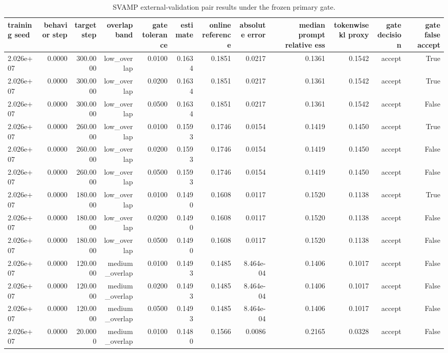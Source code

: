 \begin{table}[t]
\centering
\small
\caption{SVAMP external-validation pair results under the frozen primary gate.}
\label{tab:svamp\_pairs}
\begin{tabular}{lrrrrrrrrrrr}
\toprule
training seed & behavior step & target step & overlap band & gate tolerance & estimate & online reference & absolute error & median prompt relative ess & tokenwise kl proxy & gate decision & gate false accept \\
\midrule
2.026e+07 & 0.0000 & 300.0000 & low\_overlap & 0.0100 & 0.1634 & 0.1851 & 0.0217 & 0.1361 & 0.1542 & accept & True \\
2.026e+07 & 0.0000 & 300.0000 & low\_overlap & 0.0200 & 0.1634 & 0.1851 & 0.0217 & 0.1361 & 0.1542 & accept & True \\
2.026e+07 & 0.0000 & 300.0000 & low\_overlap & 0.0500 & 0.1634 & 0.1851 & 0.0217 & 0.1361 & 0.1542 & accept & False \\
2.026e+07 & 0.0000 & 260.0000 & low\_overlap & 0.0100 & 0.1593 & 0.1746 & 0.0154 & 0.1419 & 0.1450 & accept & True \\
2.026e+07 & 0.0000 & 260.0000 & low\_overlap & 0.0200 & 0.1593 & 0.1746 & 0.0154 & 0.1419 & 0.1450 & accept & False \\
2.026e+07 & 0.0000 & 260.0000 & low\_overlap & 0.0500 & 0.1593 & 0.1746 & 0.0154 & 0.1419 & 0.1450 & accept & False \\
2.026e+07 & 0.0000 & 180.0000 & low\_overlap & 0.0100 & 0.1490 & 0.1608 & 0.0117 & 0.1520 & 0.1138 & accept & True \\
2.026e+07 & 0.0000 & 180.0000 & low\_overlap & 0.0200 & 0.1490 & 0.1608 & 0.0117 & 0.1520 & 0.1138 & accept & False \\
2.026e+07 & 0.0000 & 180.0000 & low\_overlap & 0.0500 & 0.1490 & 0.1608 & 0.0117 & 0.1520 & 0.1138 & accept & False \\
2.026e+07 & 0.0000 & 120.0000 & medium\_overlap & 0.0100 & 0.1493 & 0.1485 & 8.464e-04 & 0.1406 & 0.1017 & accept & False \\
2.026e+07 & 0.0000 & 120.0000 & medium\_overlap & 0.0200 & 0.1493 & 0.1485 & 8.464e-04 & 0.1406 & 0.1017 & accept & False \\
2.026e+07 & 0.0000 & 120.0000 & medium\_overlap & 0.0500 & 0.1493 & 0.1485 & 8.464e-04 & 0.1406 & 0.1017 & accept & False \\
2.026e+07 & 0.0000 & 20.0000 & medium\_overlap & 0.0100 & 0.1480 & 0.1566 & 0.0086 & 0.2165 & 0.0328 & accept & False \\

\end{tabular}
\end{table}
